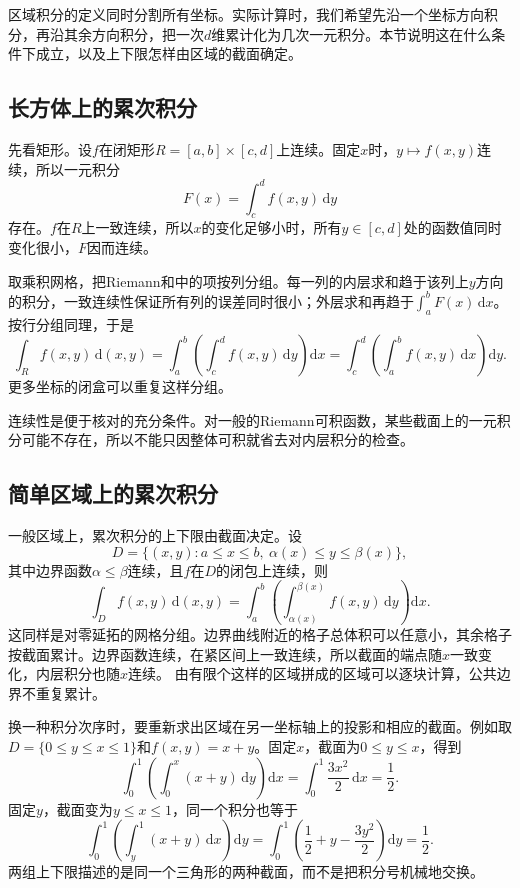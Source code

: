 区域积分的定义同时分割所有坐标。实际计算时，我们希望先沿一个坐标方向积分，再沿其余方向积分，把一次$d$维累计化为几次一元积分。本节说明这在什么条件下成立，以及上下限怎样由区域的截面确定。

\subsection{长方体上的累次积分}

先看矩形。设$f$在闭矩形$R=[a,b]\times[c,d]$上连续。固定$x$时，$y\mapsto f(x,y)$连续，所以一元积分
\[
 F(x)=\int_c^d f(x,y)\,\mathrm dy
\]
存在。$f$在$R$上一致连续，所以$x$的变化足够小时，所有$y\in[c,d]$处的函数值同时变化很小，$F$因而连续。

取乘积网格，把Riemann和中的项按列分组。每一列的内层求和趋于该列上$y$方向的积分，一致连续性保证所有列的误差同时很小；外层求和再趋于$\int_a^bF(x)\,\mathrm dx$。按行分组同理，于是
\[
 \int_R f(x,y)\,\mathrm d(x,y)
 =\int_a^b\left(\int_c^d f(x,y)\,\mathrm dy\right)\mathrm dx
 =\int_c^d\left(\int_a^b f(x,y)\,\mathrm dx\right)\mathrm dy.
\]
更多坐标的闭盒可以重复这样分组。

连续性是便于核对的充分条件。对一般的Riemann可积函数，某些截面上的一元积分可能不存在，所以不能只因整体可积就省去对内层积分的检查。

\subsection{简单区域上的累次积分}

一般区域上，累次积分的上下限由截面决定。设
\[
 D=\{(x,y):a\leq x\leq b,\ \alpha(x)\leq y\leq\beta(x)\},
\]
其中边界函数$\alpha\leq\beta$连续，且$f$在$D$的闭包上连续，则
\begin{equation}
 \int_D f(x,y)\,\mathrm d(x,y)
 =\int_a^b\left(\int_{\alpha(x)}^{\beta(x)}f(x,y)\,\mathrm dy\right)\mathrm dx.
\label{eq:classical-iterated-integral-simple-region}
\end{equation}
这同样是对零延拓的网格分组。边界曲线附近的格子总体积可以任意小，其余格子按截面累计。边界函数连续，在紧区间上一致连续，所以截面的端点随$x$一致变化，内层积分也随$x$连续。
由有限个这样的区域拼成的区域可以逐块计算，公共边界不重复累计。

换一种积分次序时，要重新求出区域在另一坐标轴上的投影和相应的截面。例如取$D=\{0\leq y\leq x\leq1\}$和$f(x,y)=x+y$。固定$x$，截面为$0\leq y\leq x$，得到
\[
 \int_0^1\left(\int_0^x(x+y)\,\mathrm dy\right)\mathrm dx
 =\int_0^1\frac{3x^2}{2}\,\mathrm dx=\frac12.
\]
固定$y$，截面变为$y\leq x\leq1$，同一个积分也等于
\[
 \int_0^1\left(\int_y^1(x+y)\,\mathrm dx\right)\mathrm dy
 =\int_0^1\left(\frac12+y-\frac{3y^2}{2}\right)\mathrm dy=\frac12.
\]
两组上下限描述的是同一个三角形的两种截面，而不是把积分号机械地交换。


